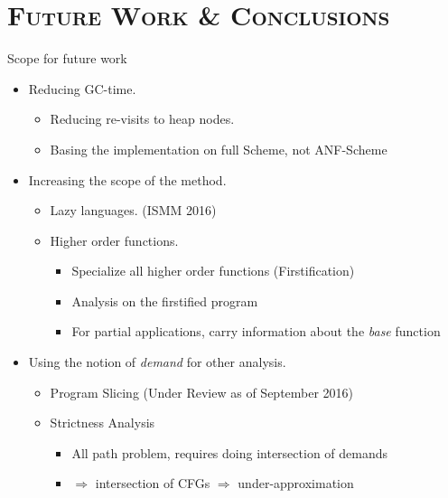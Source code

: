 \section{\scshape Future Work  \& Conclusions} 
\begin{frame}{Scope for future work}
\normalsize
\begin{itemize}[<+->]\itemsep1em
\item Reducing GC-time.
  \begin{itemize}
  \item Reducing re-visits to heap nodes.
  \item Basing the implementation on full Scheme, not ANF-Scheme
  \end{itemize}
\item Increasing the scope of the method.
  \begin{itemize}
  \item Lazy languages. (ISMM 2016)
  \item Higher order functions.
    \begin{itemize}
    \item Specialize all higher order functions (Firstification)
    \item Analysis on the firstified program 
    \item For partial applications, carry information about the {\em base} function
    \end{itemize}
  \end{itemize}
\item Using the notion of {\em demand} for other analysis.
  \begin{itemize}
  \item Program Slicing (Under Review as of September 2016)
  \item Strictness Analysis
    \begin{itemize}
    \item All path problem, requires doing intersection of demands 
    \item $\Rightarrow$ intersection of CFGs $\Rightarrow$ under-approximation
    \end{itemize}
  \end{itemize}
\end{itemize}
\end{frame}

